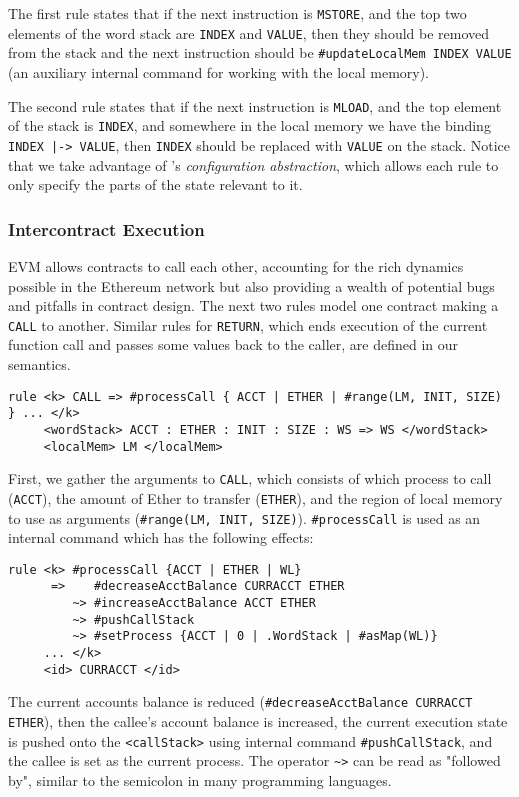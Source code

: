 The first rule states that if the next instruction is \texttt{MSTORE}, and the
top two elements of the word stack are \texttt{INDEX} and \texttt{VALUE}, then
they should be removed from the stack and the next instruction should be
\texttt{\#updateLocalMem INDEX VALUE} (an auxiliary internal command for working
with the local memory).

The second rule states that if the next instruction is \texttt{MLOAD}, and the
top element of the stack is \texttt{INDEX}, and somewhere in the local memory we
have the binding \texttt{INDEX |-> VALUE}, then \texttt{INDEX} should be
replaced with \texttt{VALUE} on the stack. Notice that we take advantage of \K's
\textit{configuration abstraction}, which allows each rule to only specify the
parts of the state relevant to it.

\subsubsection{Intercontract Execution}

EVM allows contracts to call each other, accounting for the rich dynamics
possible in the Ethereum network but also providing a wealth of potential bugs
and pitfalls in contract design. The next two rules model one contract making a
\texttt{CALL} to another. Similar rules for \texttt{RETURN}, which ends
execution of the current function call and passes some values back to the
caller, are defined in our semantics.

\begin{verbatim}
rule <k> CALL => #processCall { ACCT | ETHER | #range(LM, INIT, SIZE) } ... </k>
     <wordStack> ACCT : ETHER : INIT : SIZE : WS => WS </wordStack>
     <localMem> LM </localMem>
\end{verbatim}

First, we gather the arguments to \texttt{CALL}, which consists of which process
to call (\texttt{ACCT}), the amount of Ether to transfer (\texttt{ETHER}), and
the region of local memory to use as arguments (\texttt{\#range(LM, INIT,
SIZE)}). \texttt{\#processCall} is used as an internal command which has the
following effects:

\begin{verbatim}
rule <k> #processCall {ACCT | ETHER | WL}
      =>    #decreaseAcctBalance CURRACCT ETHER
         ~> #increaseAcctBalance ACCT ETHER
         ~> #pushCallStack
         ~> #setProcess {ACCT | 0 | .WordStack | #asMap(WL)}
     ... </k>
     <id> CURRACCT </id>
\end{verbatim}

The current accounts balance is reduced (\texttt{\#decreaseAcctBalance CURRACCT
ETHER}), then the callee's account balance is increased, the current execution
state is pushed onto the \texttt{<callStack>} using internal command
\texttt{\#pushCallStack}, and the callee is set as the current process. The
operator \texttt{\textasciitilde >} can be read as "followed by", similar to the semicolon in
many programming languages.



